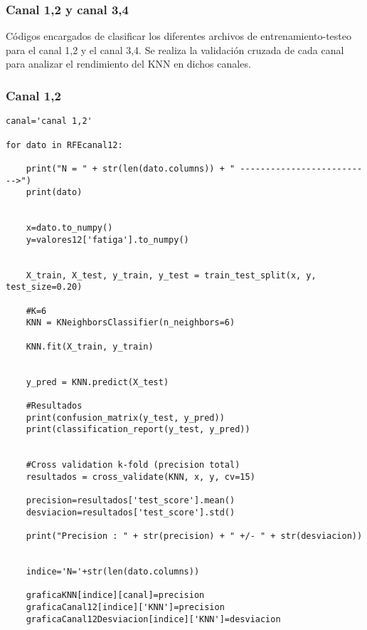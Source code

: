     \subsubsection{Canal 1,2 y canal 3,4}
Códigos encargados de clasificar los diferentes archivos de entrenamiento-testeo para el canal 1,2 y el canal 3,4.  Se realiza la validación cruzada de cada canal para analizar el rendimiento del KNN en dichos canales.
    \subsubsection{Canal 1,2}
\begin{lstlisting}
canal='canal 1,2'

for dato in RFEcanal12:
    
    print("N = " + str(len(dato.columns)) + " -------------------------->")
    print(dato)
    
    
    x=dato.to_numpy()
    y=valores12['fatiga'].to_numpy()
    
    
    X_train, X_test, y_train, y_test = train_test_split(x, y, test_size=0.20)

    #K=6
    KNN = KNeighborsClassifier(n_neighbors=6)
    
    KNN.fit(X_train, y_train)


    y_pred = KNN.predict(X_test)

    #Resultados
    print(confusion_matrix(y_test, y_pred))
    print(classification_report(y_test, y_pred))

    
    #Cross validation k-fold (precision total)
    resultados = cross_validate(KNN, x, y, cv=15)
    
    precision=resultados['test_score'].mean()
    desviacion=resultados['test_score'].std()
    
    print("Precision : " + str(precision) + " +/- " + str(desviacion))
    
    
    indice='N='+str(len(dato.columns))
    
    graficaKNN[indice][canal]=precision
    graficaCanal12[indice]['KNN']=precision
    graficaCanal12Desviacion[indice]['KNN']=desviacion
\end{lstlisting}


